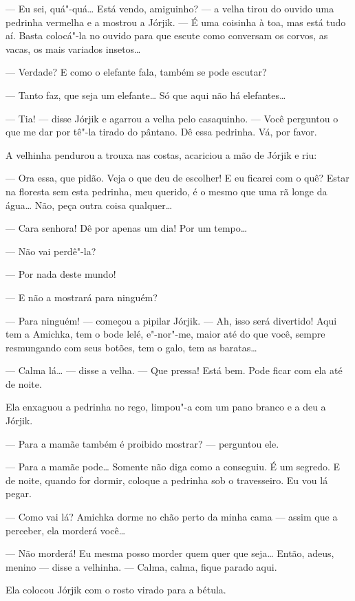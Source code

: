 --- Eu sei, quá"-quá\ldots{} Está vendo, amiguinho? --- a velha tirou do
ouvido uma pedrinha vermelha e a mostrou a Jórjik. --- É uma coisinha à
toa, mas está tudo aí. Basta colocá"-la no ouvido para que escute como
conversam os corvos, as vacas, os mais variados insetos\ldots{}

--- Verdade? E como o elefante fala, também se pode escutar?

--- Tanto faz, que seja um elefante\ldots{} Só que aqui não há elefantes\ldots{}

--- Tia! --- disse Jórjik e agarrou a velha pelo casaquinho. --- Você
perguntou o que me dar por tê"-la tirado do pântano. Dê essa pedrinha.
Vá, por favor.

A velhinha pendurou a trouxa nas costas, acariciou a mão de Jórjik e
riu:

--- Ora essa, que pidão. Veja o que deu de escolher! E eu ficarei com o
quê? Estar na floresta sem esta pedrinha, meu querido, é o mesmo que uma
rã longe da água\ldots{} Não, peça outra coisa qualquer\ldots{}

--- Cara senhora! Dê por apenas um dia! Por um tempo\ldots{}

--- Não vai perdê"-la?

--- Por nada deste mundo!

--- E não a mostrará para ninguém?

--- Para ninguém! --- começou a pipilar Jórjik. --- Ah, isso será
divertido! Aqui tem a Amichka, tem o bode lelé, e"-nor"-me, maior até do
que você, sempre resmungando com seus botões, tem o galo, tem as
baratas\ldots{}

--- Calma lá\ldots{} --- disse a velha. --- Que pressa! Está bem. Pode ficar
com ela até de noite.

Ela enxaguou a pedrinha no rego, limpou"-a com um pano branco e a deu a
Jórjik.

--- Para a mamãe também é proibido mostrar? --- perguntou ele.

--- Para a mamãe pode\ldots{} Somente não diga como a conseguiu. É um
segredo. E de noite, quando for dormir, coloque a pedrinha sob o
travesseiro. Eu vou lá pegar.

--- Como vai lá? Amichka dorme no chão perto da minha cama --- assim que
a perceber, ela morderá você\ldots{}

--- Não morderá! Eu mesma posso morder quem quer que seja\ldots{} Então,
adeus, menino --- disse a velhinha. --- Calma, calma, fique parado aqui.

Ela colocou Jórjik com o rosto virado para a bétula.

